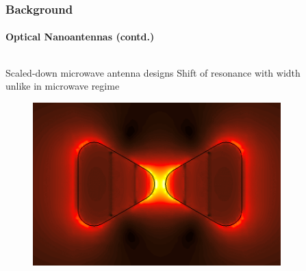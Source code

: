 \documentclass[mathserif,16pt,xcolor=table]{beamer}
\begin{document}
        \begin{frame}
          \frametitle{Background}
          \framesubtitle{Optical Nanoantennas (contd.)}

          \begin{columns} %
            \begin{column}{.45\textwidth}
              \begin{minipage}[T][.1\textheight][c]{\linewidth}
                \begin{outline}[itemize]
                  \1 Scaled-down microwave antenna designs
                  \1 Shift of resonance with width unlike in microwave regime
                \end{outline}
                \begin{figure}
                  \includegraphics[scale=.03]{bowtie_field_map.png}
                \end{figure}
              \end{minipage}
            \end{column}
            \begin{column}{.55\textwidth}
              \vspace{-1.75cm}
              \begin{figure}
                \centering


\end{figure}
\end{column}
\end{columns}
\end{frame}
\end{document}
